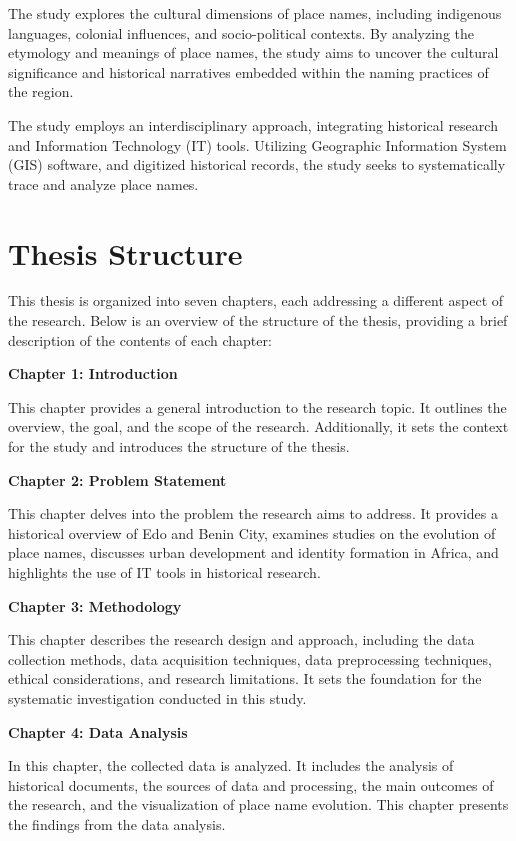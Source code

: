 The study explores the cultural dimensions of place names, including indigenous languages, colonial influences, and socio-political contexts. By analyzing the etymology and meanings of place names, the study aims to uncover the cultural significance and historical narratives embedded within the naming practices of the region.


The study employs an interdisciplinary approach, integrating historical research and Information Technology (IT) tools. Utilizing Geographic Information System (GIS) software, and digitized historical records, the study seeks to systematically trace and analyze place names.

\section{Thesis Structure}

This thesis is organized into seven chapters, each addressing a different aspect of the research. Below is an overview of the structure of the thesis, providing a brief description of the contents of each chapter:

\textbf{Chapter 1: Introduction}

This chapter provides a general introduction to the research topic. It outlines the overview, the goal, and the scope of the research. Additionally, it sets the context for the study and introduces the structure of the thesis.

\textbf{Chapter 2: Problem Statement}

This chapter delves into the problem the research aims to address. It provides a historical overview of Edo and Benin City, examines studies on the evolution of place names, discusses urban development and identity formation in Africa, and highlights the use of IT tools in historical research.

\textbf{Chapter 3: Methodology}

This chapter describes the research design and approach, including the data collection methods, data acquisition techniques, data preprocessing techniques, ethical considerations, and research limitations. It sets the foundation for the systematic investigation conducted in this study.

\textbf{Chapter 4: Data Analysis}

In this chapter, the collected data is analyzed. It includes the analysis of historical documents, the sources of data and processing, the main outcomes of the research, and the visualization of place name evolution. This chapter presents the findings from the data analysis.

